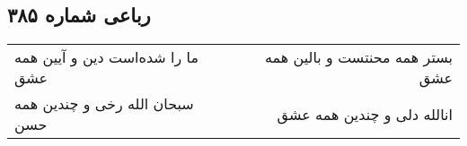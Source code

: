 \begin{center}
\section*{رباعی شماره ۳۸۵}
\label{sec:sh385}
\begin{longtable}{l p{0.5cm} r}
ما را شده‌است دین و آیین همه عشق
&&
بستر همه محنتست و بالین همه عشق
\\
سبحان الله رخی و چندین همه حسن
&&
انالله دلی و چندین همه عشق
\\
\end{longtable}
\end{center}

